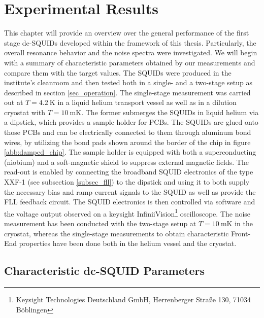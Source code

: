 \chapter{Experimental Results} \label{ch_results}

This chapter will provide an overview over the general performance of the first stage dc-SQUIDs developed within the framework of this thesis. Particularly, the overall resonance behavior and the noise spectra were investigated. We will begin with a summary of characteristic parameters obtained by our measurements and compare them with the target values. The SQUIDs were produced in the institute's cleanroom and then tested both in a single- and a two-stage setup as described in section \ref{sec_operation}. The single-stage measurement was carried out at $T=\qty{4.2}{\kelvin}$ in a liquid helium transport vessel as well as in a dilution cryostat with $T=\qty{10}{\milli\kelvin}$. The former submerges the SQUIDs in liquid helium via a dipstick, which provides a sample holder for PCBs. The SQUIDs are glued onto those PCBs and can be electrically connected to them through aluminum bond wires, by utilizing the bond pads shown around the border of the chip in figure \ref{abb:damped_chip}. The sample holder is equipped with both a superconducting (niobium) and a soft-magnetic shield to suppress external magnetic fields. The read-out is enabled by connecting the broadband SQUID electronics of the type XXF-1 (see subsection \ref{subsec_fll}) to the dipstick and using it to both supply the necessary bias and ramp current signals to the SQUID as well as provide the FLL feedback circuit. The SQUID electronics is then controlled via software and the voltage output observed on a keysight InfiniiVision\footnote{Keysight Technologies Deutschland GmbH, Herrenberger Straße 130, 71034 Böblingen} oscilloscope. The noise measurement has been conducted with the two-stage setup at $T=\qty{10}{\milli\kelvin}$ in the cryostat, whereas the single-stage measurements to obtain characteristic Front-End properties have been done both in the helium vessel and the cryostat. 

\section{Characteristic dc-SQUID Parameters}

